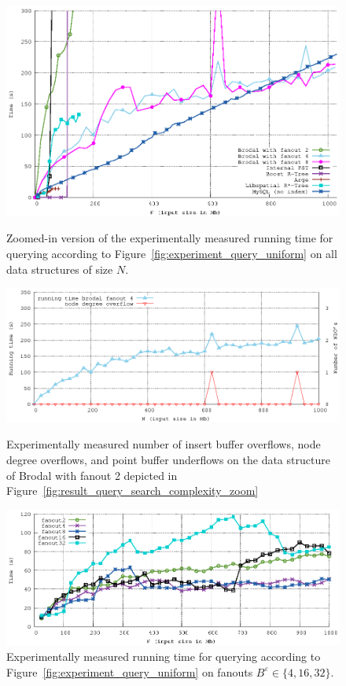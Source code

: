 \documentclass[twoside,11pt,openright]{report}
\def \epsilon {\varepsilon}
\begin{document}
\begin{figure}[h]
\centering
\includegraphics[width=\textwidth]{../src/experiments/query_experiment_results/final2/time_zoom}
\caption{Zoomed-in version of the experimentally measured running time for querying according to Figure~\ref{fig:experiment_query_uniform} on all data structures of size $N$.}
\label{fig:result_query_search_complexity_zoom}
\centering
\includegraphics[width=\textwidth]{../src/experiments/query_experiment_results/final2/all_operations2}
\caption{Experimentally measured number of insert buffer overflows, node degree overflows, and point buffer underflows on the data structure of Brodal with fanout 2 depicted in Figure~\ref{fig:result_query_search_complexity_zoom}}
\label{fig:result_query_search_fixup}
\centering
\includegraphics[width=\textwidth]{../src/experiments/gerth_query_fanout_experiment_results/2016-06-08.19_09_06/time}
\caption{Experimentally measured running time for querying according to Figure~\ref{fig:experiment_query_uniform} on fanouts $B^\epsilon \in \{4, 16, 32 \}$.}
\label{fig:gerth_query_fanout_experiment}
\end{figure}
\end{document}
